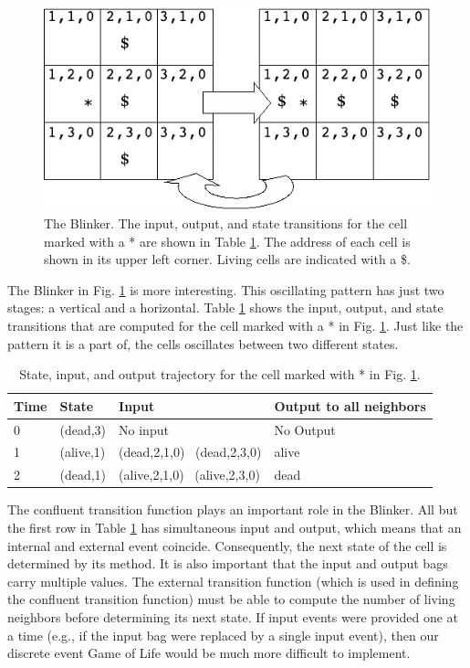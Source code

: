 \begin{figure}[ht]
\centering
\includegraphics{network_models_figs/blinker.pdf}
\caption{The Blinker. The input, output, and state transitions for the cell marked with a * are shown in Table \ref{tab:blinker_cell_activity}. The address of each cell is shown in its upper left corner. Living cells are indicated with a \$.}
\label{fig:gol_blinker}
\end{figure}
The Blinker in Fig. \ref{fig:gol_blinker} is more interesting. This oscillating pattern has just two stages: a vertical and a horizontal. Table \ref{tab:blinker_cell_activity} shows the input, output, and state transitions that are computed for the cell marked with a * in Fig. \ref{fig:gol_blinker}. Just like the pattern it is a part of, the cells oscillates between two different states.
\begin{table}[ht]
\centering
\begin{tabular}{|l|l|l|l|}
\hline Time & State      & Input & Output to all neighbors\\ \hline
0 & (dead,3) & No input & No Output \\ \hline
1 & (alive,1) & (dead,2,1,0) \ (dead,2,3,0) & alive \\ \hline
2 & (dead,1) & (alive,2,1,0) \ (alive,2,3,0) & dead \\ \hline
\end{tabular}
\caption{State, input, and output trajectory for the cell marked with * in Fig. \ref{fig:gol_blinker}.}
\label{tab:blinker_cell_activity}
\end{table}

The confluent transition function plays an important role in the Blinker. All but the first row in Table \ref{tab:blinker_cell_activity} has simultaneous input and output, which means that an internal and external event coincide. Consequently, the next state of the cell is determined by its  method. It is also important that the input and output bags carry multiple values. The external transition function (which is used in defining the confluent transition function) must be able to compute the number of living neighbors before determining its next state. If input events were provided one at a time (e.g., if the input bag were replaced by a single input event), then our discrete event Game of Life would be much more difficult to implement.
